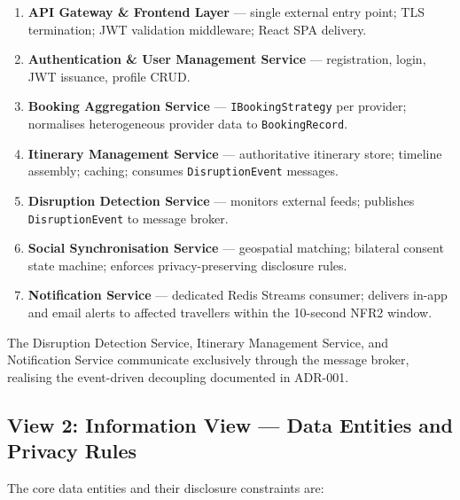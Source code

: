 \documentclass[12pt,a4paper]{article}
\begin{document}
\begin{enumerate}[noitemsep]
  \item \textbf{API Gateway \& Frontend Layer} — single external entry point; TLS termination;
        JWT validation middleware; React SPA delivery.
  \item \textbf{Authentication \& User Management Service} — registration, login, JWT issuance,
        profile CRUD.
  \item \textbf{Booking Aggregation Service} — \texttt{IBookingStrategy} per provider; normalises
        heterogeneous provider data to \texttt{BookingRecord}.
  \item \textbf{Itinerary Management Service} — authoritative itinerary store; timeline assembly;
        caching; consumes \texttt{DisruptionEvent} messages.
  \item \textbf{Disruption Detection Service} — monitors external feeds; publishes
        \texttt{DisruptionEvent} to message broker.
  \item \textbf{Social Synchronisation Service} — geospatial matching; bilateral consent state
        machine; enforces privacy-preserving disclosure rules.
  \item \textbf{Notification Service} — dedicated Redis Streams consumer; delivers in-app and
        email alerts to affected travellers within the 10-second NFR2 window.
\end{enumerate}

The Disruption Detection Service, Itinerary Management Service, and Notification Service
communicate exclusively through the message broker, realising the event-driven decoupling
documented in ADR-001.

\subsection{View 2: Information View — Data Entities and Privacy Rules}

The core data entities and their disclosure constraints are:
\end{document}
